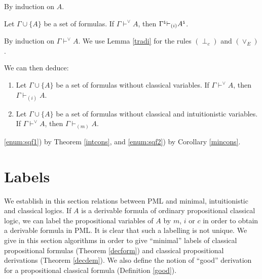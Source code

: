 \documentclass{jancl}
\begin{document}
\begin{proof*}
By induction on $A$.
\end{proof*}

\begin{theorem}\label{intcons}
Let ${\Gamma} \cup \{ A \}$ be a set of formulas.
If ${\Gamma} {\vdash}^{\vee} A$, then ${\Gamma}^{\tt i} {\vdash}_{(i)} A^{\tt i}$.
\end{theorem}

\begin{proof*}
By induction on ${\Gamma} {\vdash}^{\vee} A$. We use Lemma \ref{tradi}
for the rules $(\perp_c)$ and $({\vee}_E)$.
\end{proof*}

We can then deduce:
\begin{corollary} \label{imp-part}
\begin{enumerate}
\item Let ${\Gamma} \cup \{ A \}$ be a set of formulas without classical
variables. If ${\Gamma} {\vdash}^{\vee} A$, then ${\Gamma} {\vdash}_{(i)}
A$.\label{enum:sqf1}

\item Let ${\Gamma} \cup \{ A \}$ be a set of formulas without classical
and intuitionistic variables.  If ${\Gamma} {\vdash}^{\vee} A$, then ${\Gamma}
{\vdash}_{(m)} A$.\label{enum:sqf2}
\end{enumerate}
\end{corollary}

\begin{proof*}
\ref{enum:sqf1}) by Theorem \ref{intcons}, and \ref{enum:sqf2}) by
Corollary \ref{mincons}.
\end{proof*}

\section{Labels}

We establish in this section relations between PML and minimal,
intuitionistic and classical logics. If $A$ is a derivable formula
of ordinary propositional classical logic, we can label the
propositional variables of $A$ by $m$, $i$ or $c$ in order to
obtain a derivable formula in PML. It is clear that such a
labelling is not unique. We give in this section algorithms in
order to give ``minimal'' labels of classical propositional
formulas (Theorem \ref{decform}) and classical propositional
derivations (Theorem \ref{decdem}). We also define the notion of
``good'' derivation for a propositional classical formula
(Definition \ref{good}).
\end{document}
